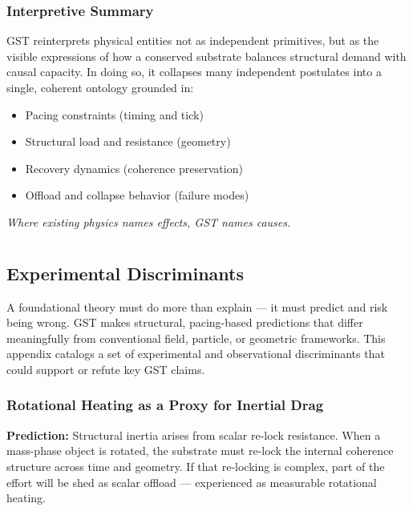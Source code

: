 \documentclass[entropy,article,submit,pdftex,moreauthors]{Definitions/mdpi}
\begin{document}
\subsubsection*{Interpretive Summary}

GST reinterprets physical entities not as independent primitives, but as the visible expressions of how a conserved substrate balances structural demand with causal capacity. In doing so, it collapses many independent postulates into a single, coherent ontology grounded in:

\begin{itemize}
    \item Pacing constraints (timing and tick)
    \item Structural load and resistance (geometry)
    \item Recovery dynamics (coherence preservation)
    \item Offload and collapse behavior (failure modes)
\end{itemize}

\textit{Where existing physics names effects, GST names causes.}
\section[\appendixname~\thesection]{}
\subsection[\appendixname~\thesubsection]{Experimental Discriminants}
\label{app:experimental-discriminants}

A foundational theory must do more than explain — it must predict and risk being wrong. GST makes structural, pacing-based predictions that differ meaningfully from conventional field, particle, or geometric frameworks. This appendix catalogs a set of experimental and observational discriminants that could support or refute key GST claims.

\subsubsection{Rotational Heating as a Proxy for Inertial Drag}

\textbf{Prediction:} Structural inertia arises from scalar re-lock resistance. When a mass-phase object is rotated, the substrate must re-lock the internal coherence structure across time and geometry. If that re-locking is complex, part of the effort will be shed as scalar offload — experienced as measurable rotational heating.
\end{document}
